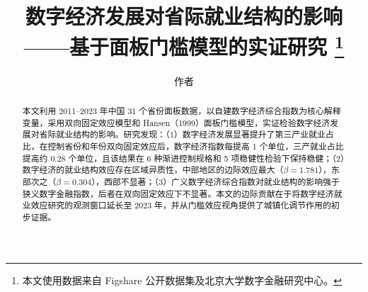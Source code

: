 \documentclass{chinese-erj}
\title{数字经济发展对省际就业结构的影响——基于面板门槛模型的实证研究%
    \thanks{本文使用数据来自 Figshare 公开数据集及北京大学数字金融研究中心。}}
\author{作者}
\begin{document}
\maketitle

\begin{abstract}
本文利用 2011--2023 年中国 31 个省份面板数据，以自建数字经济综合指数为核心解释变量，采用双向固定效应模型和 Hansen（1999）面板门槛模型，实证检验数字经济发展对省际就业结构的影响。研究发现：（1）数字经济发展显著提升了第三产业就业占比，在控制省份和年份双向固定效应后，数字经济指数每提高 1 个单位，三产就业占比提高约 0.28 个单位，且该结果在 6 种渐进控制规格和 5 项稳健性检验下保持稳健；（2）数字经济的就业结构效应存在区域异质性，中部地区的边际效应最大（$\beta=1.781$），东部次之（$\beta=0.304$），西部不显著；（3）广义数字经济综合指数对就业结构的影响强于狭义数字金融指数，后者在双向固定效应下不显著。本文的边际贡献在于将数字经济就业效应研究的观测窗口延长至 2023 年，并从门槛效应视角提供了城镇化调节作用的初步证据。

\end{abstract}








\erjref
\printbibliography[heading=none]

\enmaketitle
\end{document}
